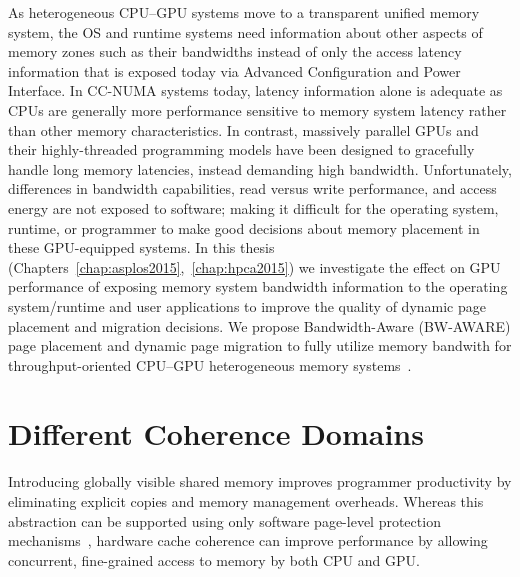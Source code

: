 As heterogeneous CPU--GPU systems move to a transparent unified memory system,
the OS and runtime systems need information about other aspects of memory zones
such as their bandwidths instead of only the access latency information that is
exposed today via Advanced Configuration and Power Interface. In CC-NUMA
systems today, latency information alone is adequate as CPUs are generally more
performance sensitive to memory system latency rather than other memory
characteristics. In contrast, massively parallel GPUs and their highly-threaded
programming models have been designed to gracefully handle long memory
latencies, instead demanding high bandwidth. Unfortunately, differences in
bandwidth capabilities, read versus write performance, and access energy are not
exposed to software; making it difficult for the operating system, runtime, or
programmer to make good decisions about memory placement in these GPU-equipped
systems. In this thesis (Chapters~\ref{chap:asplos2015},~\ref{chap:hpca2015}) we
investigate the effect on GPU performance of exposing memory system bandwidth
information to the operating system/runtime and user applications to improve the
quality of dynamic page placement and migration decisions. We propose
Bandwidth-Aware (BW-AWARE) page placement and dynamic page migration to fully
utilize memory bandwith for throughput-oriented CPU--GPU heterogeneous memory
systems~\cite{ref:agarwal:hpca2015,ref:agarwal:asplos2015}.

\section{Different Coherence Domains}
Introducing globally visible shared memory improves programmer productivity by
eliminating explicit copies and memory management overheads. Whereas this
abstraction can be supported using only software page-level protection
mechanisms~\cite{UVM, HSA}, hardware cache coherence can improve performance by
allowing concurrent, fine-grained access to memory by both CPU and GPU.

